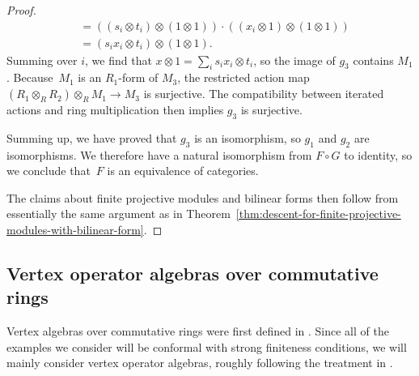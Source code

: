 \begin{proof}
\begin{align*}
&= ((s_i \otimes t_i) \otimes (1 \otimes 1))\cdot ((x_i \otimes 1) \otimes (1 \otimes 1)) \\
&= (s_i x_i \otimes t_i) \otimes (1 \otimes 1).
\end{align*}
Summing over $i$, we find that $x \otimes 1 = \sum_i s_i x_i \otimes t_i$, so the image of $g_3$ contains $M_1$. Because~$M_1$ is an $R_1$-form of $M_3$, the restricted action map $(R_1 \otimes_{R} R_2) \otimes_{R} M_1 \to M_3$ is surjective. The compatibility between iterated actions and ring multiplication then implies $g_3$ is surjective.

Summing up, we have proved that $g_3$ is an isomorphism, so $g_1$ and $g_2$ are isomorphisms. We therefore have a natural isomorphism from $F \circ G$ to identity, so we conclude that~$F$ is an equivalence of categories.

The claims about finite projective modules and bilinear forms then follow from essentially the same argument as in Theorem~\ref{thm:descent-for-finite-projective-modules-with-bilinear-form}.
\end{proof}

\subsection{Vertex operator algebras over commutative rings}

Vertex algebras over commutative rings were first defined in \cite{B86}. Since all of the examples we consider will be conformal with strong finiteness conditions, we will mainly consider vertex operator algebras, roughly following the treatment in \cite{DR13}.

